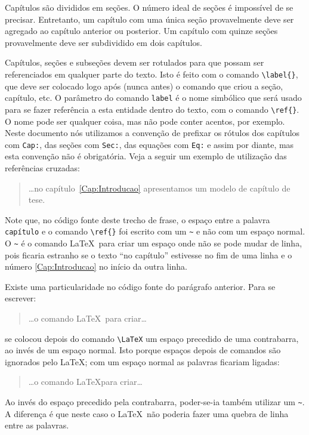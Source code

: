 Capítulos são divididos em seções. O número ideal de seções é
impossível de se precisar. Entretanto, um capítulo com uma única seção
provavelmente deve ser agregado ao capítulo anterior ou posterior. Um
capítulo com quinze seções provavelmente deve ser subdividido em dois
capítulos.

Capítulos, seções e subseções devem ser rotulados para que possam ser
referenciados em qualquer parte do texto.  Isto é feito com o comando
\verb|\label{}|, que deve ser colocado logo após (nunca antes) o
comando que criou a seção, capítulo, etc. O parâmetro do comando
\texttt{label} é o nome simbólico que será usado para se fazer
referência a esta entidade dentro do texto, com o comando
\verb|\ref{}|. O nome pode ser qualquer coisa, mas não pode conter
acentos, por exemplo. Neste documento nós utilizamos a convenção de
prefixar os rótulos dos capítulos com \texttt{Cap:}, das seções com
\texttt{Sec:}, das equações com \texttt{Eq:} e assim por diante, mas
esta convenção não é obrigatória. Veja a seguir um exemplo de
utilização das referências cruzadas:
\begin{quotation}
\dots no capítulo~\ref{Cap:Introducao} apresentamos um modelo de
capítulo de tese.
\end{quotation}
Note que, no código fonte deste trecho de frase, o espaço entre a palavra
\texttt{capítulo} e o comando \verb|\ref{}| foi escrito com
um \texttt{\~{}} e não com um espaço normal. O \texttt{\~{}} é o
comando \LaTeX\ para criar um espaço onde não se pode mudar de linha,
pois ficaria estranho se o texto ``no capítulo'' estivesse no fim de
uma linha e o número \ref{Cap:Introducao} no início da outra linha.

Existe uma particularidade no código fonte do parágrafo anterior. Para
se escrever:
\begin{quotation}
\dots o comando \LaTeX\ para criar\dots
\end{quotation}
se colocou depois do comando \verb|\LaTeX| um espaço
precedido de uma contrabarra, ao invés de um espaço normal. Isto porque
espaços depois de comandos são ignorados pelo \LaTeX; com um espaço
normal as palavras ficariam ligadas:
\begin{quotation}
\dots o comando \LaTeX para criar\dots
\end{quotation}
Ao invés do espaço precedido pela contrabarra, poder-se-ia também
utilizar um \texttt{\~{}}. A diferença é que neste caso o \LaTeX\ não
poderia fazer uma quebra de linha entre as palavras.

